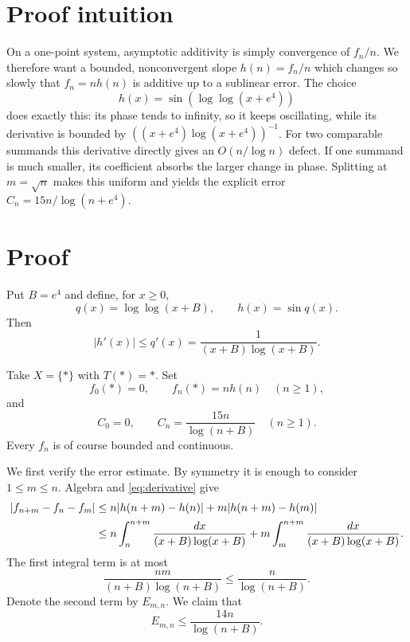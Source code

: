 \documentclass[11pt]{article}
\begin{document}
\section{Proof intuition}

On a one-point system, asymptotic additivity is simply convergence of
$f_n/n$. We therefore want a bounded, nonconvergent slope $h(n)=f_n/n$ which
changes so slowly that $f_n=nh(n)$ is additive up to a sublinear error. The
choice
\[
 h(x)=\sin(\log\log(x+e^4))
\]
does exactly this: its phase tends to infinity, so it keeps oscillating, while
its derivative is bounded by
$((x+e^4)\log(x+e^4))^{-1}$. For two comparable summands this derivative
directly gives an $O(n/\log n)$ defect. If one summand is much smaller, its
coefficient absorbs the larger change in phase. Splitting at $m=\sqrt n$
makes this uniform and yields the explicit error
$C_n=15n/\log(n+e^4)$.

\section{Proof}

Put $B=e^4$ and define, for $x\geq0$,
\[
 q(x)=\log\log(x+B),\qquad h(x)=\sin q(x).
\]
Then
\begin{equation}\label{eq:derivative}
 |h'(x)|\leq q'(x)=\frac{1}{(x+B)\log(x+B)}.
\end{equation}

Take $X=\{*\}$ with $T(*)=*$. Set
\[
 f_0(*)=0,\qquad f_n(*)=n h(n)\quad(n\geq1),
\]
and
\begin{equation}\label{eq:C}
 C_0=0,\qquad C_n=\frac{15n}{\log(n+B)}\quad(n\geq1).
\end{equation}
Every $f_n$ is of course bounded and continuous.

We first verify the error estimate. By symmetry it is enough to consider
$1\leq m\leq n$. Algebra and \eqref{eq:derivative} give
\begin{align}
 |f_{n+m}-f_n-f_m|
 &\leq n|h(n+m)-h(n)|+m|h(n+m)-h(m)| \notag\\
 &\leq n\int_n^{n+m}\frac{dx}{(x+B)\log(x+B)}
   +m\int_m^{n+m}\frac{dx}{(x+B)\log(x+B)}.\label{eq:split}
\end{align}
The first integral term is at most
\begin{equation}\label{eq:first}
 \frac{nm}{(n+B)\log(n+B)}\leq\frac{n}{\log(n+B)}.
\end{equation}
Denote the second term by $E_{m,n}$. We claim that
\begin{equation}\label{eq:second}
 E_{m,n}\leq\frac{14n}{\log(n+B)}.
\end{equation}
\end{document}
